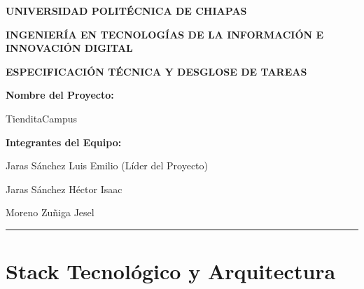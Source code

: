 \documentclass[11pt, letterpaper]{article}
\begin{document}
    \begin{titlepage}
        \centering
        \vspace*{1cm}

        {\bfseries\LARGE UNIVERSIDAD POLITÉCNICA DE CHIAPAS \par}
        \vspace{1cm}
        {\bfseries\Large INGENIERÍA EN TECNOLOGÍAS DE LA INFORMACIÓN E INNOVACIÓN DIGITAL \par}
        \vspace{2cm}

        {\bfseries\Huge ESPECIFICACIÓN TÉCNICA Y DESGLOSE DE TAREAS \par}
        \vspace{2.5cm}

        {\Large \textbf{Nombre del Proyecto:} \par}
        \vspace{0.5cm}
        {\Large TienditaCampus \par}

        \vspace{2.5cm}

        {\large \textbf{Integrantes del Equipo:} \par}
        \vspace{0.4cm}
        {\large Jaras Sánchez Luis Emilio (Líder del Proyecto) \par}
        \vspace{0.2cm}
        {\large Jaras Sánchez Héctor Isaac \par}
        \vspace{0.2cm}
        {\large Moreno Zuñiga Jesel \par}

        \vfill

    \end{titlepage}

    \setcounter{page}{2}

    \begin{abstract}
        Este documento detalla la transformación de las Historias de Usuario (negocio) que conforman el núcleo de la plataforma TienditaCampus en especificaciones técnicas y tareas de desarrollo (ingeniería), cubriendo el ciclo completo desde la autenticación hasta la analítica financiera y la configuración PWA.
    \end{abstract}

    \hrule
    \vspace{1.5em}

    \section{Stack Tecnológico y Arquitectura}
\end{document}
